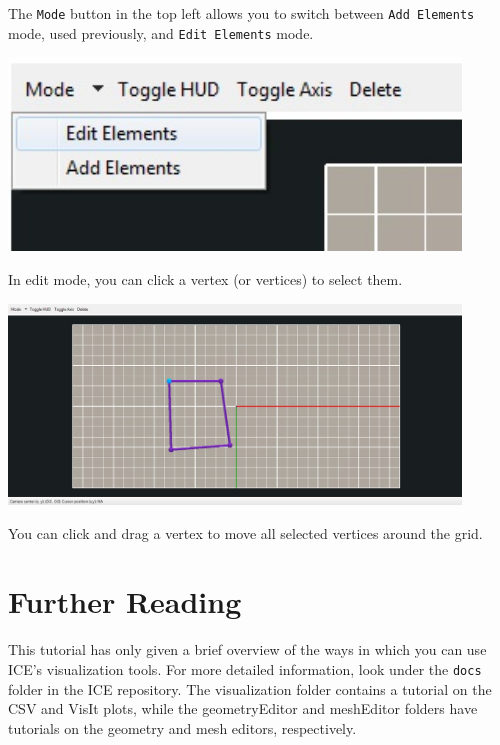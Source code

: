\documentclass{article}
\begin{document}
The \texttt{Mode} button in the top left allows you to switch between
\texttt{Add Elements} mode, used previously, and \texttt{Edit Elements} mode.

\begin{center}
\includegraphics[width=12cm]{images/EditMode}
\end{center}

In edit mode, you can click a vertex (or vertices) to select them. 

\begin{center}
\includegraphics[width=12cm]{images/SelectedVertex}
\end{center}

You can click and drag a vertex to move all selected vertices around the grid.

\section{Further Reading}

This tutorial has only given a brief overview of the ways in which you can use
ICE's visualization tools. For more detailed information, look under the
\texttt{docs} folder in the ICE repository. The visualization folder contains a
tutorial on the CSV and VisIt plots, while the geometryEditor and meshEditor
folders have tutorials on the geometry and mesh editors, respectively. 
\end{document}
